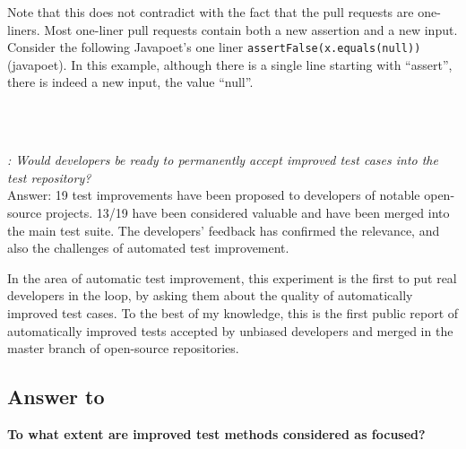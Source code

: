 Note that this does not contradict with the fact that the pull requests are one-liners.
Most one-liner pull requests contain both a new assertion and a new input. Consider the following Javapoet's one liner \texttt{assertFalse(x.equals(null))} (javapoet). 
In this example, although there is a single line starting with ``assert'', there is indeed a new input, the value ``null''.

~\\
~\\
\begin{mdframed}
	\textit{\rqpullrequest: Would developers be ready to permanently accept improved test cases into the test repository?}\\
	Answer: 19 test improvements have been proposed to developers of notable open-source projects. 
	13/19 have been considered valuable and have been merged into the main test suite. 
	The developers' feedback has confirmed the relevance, and also the challenges of automated test improvement.
\end{mdframed}

In the area of automatic test improvement, this experiment is the first to put real developers in the loop, by asking them about the quality of automatically improved test cases.
To the best of my knowledge, this is the first public report of automatically improved tests accepted by unbiased developers and merged in the master branch of open-source repositories.




\subsection{Answer to \rqcandidates{}}
\label{subsec:test-improvement:experiment-results:rq2}

\textbf{\rqcandidates{} To what extent are improved test methods considered as focused?}

